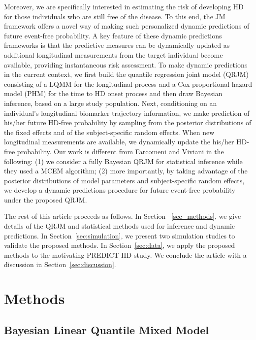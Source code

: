 \documentclass[Crown, sagev, times, doublespace]{sagej}
\begin{document}
Moreover, we are specifically interested in estimating the risk of developing HD for those individuals who are still free of the disease. To this end, the JM framework offers a novel way of making such personalized dynamic predictions of future event-free probability.\citep{rizopoulos2011dynamic,taylor2013real} A key feature of these dynamic predictions frameworks is that the predictive measures can be dynamically updated as additional longitudinal measurements from the target individual become available, providing instantaneous risk assessment. To make dynamic predictions in the current context, we first build the quantile regression joint model (QRJM) consisting of a LQMM for the longitudinal process and a Cox proportional hazard model (PHM) for the time to HD onset process and then draw Bayesian inference, based on a large study population. Next, conditioning on an individual's longitudinal biomarker trajectory information, we make prediction of his/her future HD-free probability by sampling from the posterior distributions of the fixed effects and of the subject-specific random effects. When new longitudinal measurements are available, we dynamically update the his/her HD-free probability. Our work is different from Farcomeni and Viviani \cite{farcomeni2015longitudinal} in the following: (1) we consider a fully Bayesian QRJM for statistical inference while they used a MCEM algorithm; (2) more importantly, by taking advantage of the posterior distributions of model parameters and subject-specific random effects, we develop a dynamic predictions procedure for future event-free probability under the proposed QRJM.

The rest of this article proceeds as follows. In Section ~\ref{sec_methods}, we give details of the QRJM and statistical methods used for inference and dynamic predictions. In Section~\ref{sec:simulation}, we present two simulation studies to validate the proposed methods. In Section~\ref{sec:data}, we apply the proposed methods to the motivating PREDICT-HD study. We conclude the article with a discussion in Section~\ref{sec:discussion}.

\section{Methods\label{sec_methods}}
\subsection{Bayesian Linear Quantile Mixed Model}\label{sec:BLQMM}%
\end{document}
